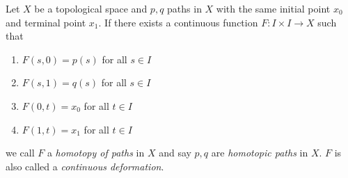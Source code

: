 \documentclass{article}
\begin{document}
Let $X$ be a topological space and $p,q$ paths in $X$ with the same initial point $x_{0}$ and terminal point $x_{1}$. If there exists a continuous function $F: I \times I \to X$ such that
\begin{enumerate}
\item $F(s,0)=p(s)$ for all $s \in I$
\item $F(s,1)=q(s)$ for all $s \in I$
\item $F(0,t)=x_{0}$ for all $t \in I$
\item $F(1,t)=x_{1}$ for all $t \in I$
\end{enumerate}

we call $F$ a \emph{homotopy of paths} in $X$ and say $p,q$ are \emph{homotopic paths} in $X$. $F$ is also called a \emph{continuous deformation}.
\end{document}
